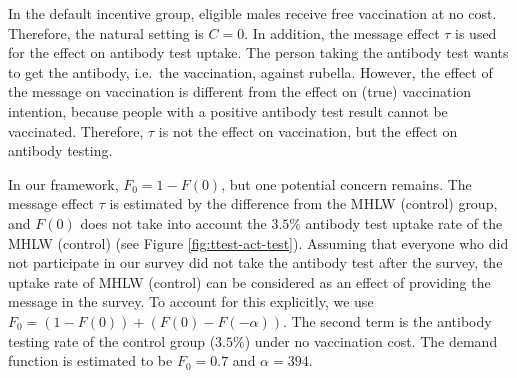 \documentclass[
]{article}
\begin{document}
In the default incentive group, eligible males receive free vaccination at no cost. Therefore, the natural setting is \(C=0\). In addition, the message effect \(\tau\) is used for the effect on antibody test uptake. The person taking the antibody test wants to get the antibody, i.e.~the vaccination, against rubella. However, the effect of the message on vaccination is different from the effect on (true) vaccination intention, because people with a positive antibody test result cannot be vaccinated. Therefore, \(\tau\) is not the effect on vaccination, but the effect on antibody testing.

In our framework, \(F_0=1-F(0)\), but one potential concern remains. The message effect \(\tau\) is estimated by the difference from the MHLW (control) group, and \(F(0)\) does not take into account the \(3.5\)\% antibody test uptake rate of the MHLW (control) (see Figure \ref{fig:ttest-act-test}). Assuming that everyone who did not participate in our survey did not take the antibody test after the survey, the uptake rate of MHLW (control) can be considered as an effect of providing the message in the survey. To account for this explicitly, we use \(F_0=(1-F(0))+(F(0)-F(-\alpha))\). The second term is the antibody testing rate of the control group (\(3.5\)\%) under no vaccination cost. The demand function is estimated to be \(F_0=0.7\) and \(\alpha=394\).
\end{document}
